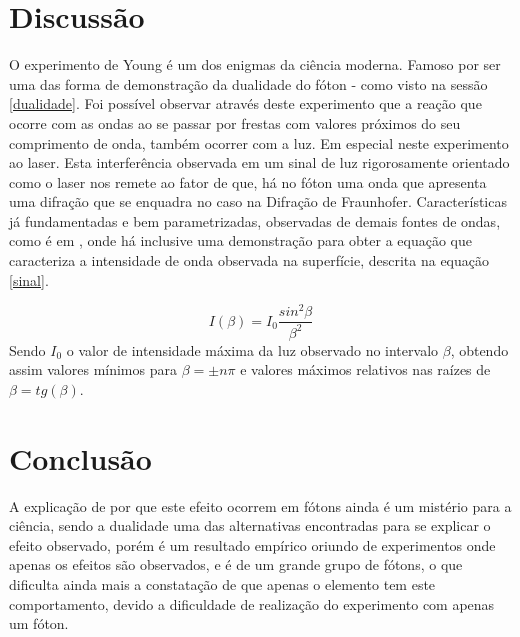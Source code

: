 \section{Discussão}\label{discurso}


O experimento de Young é um dos enigmas da ciência moderna. Famoso por ser uma das forma de demonstração da dualidade do fóton - como visto na sessão \ref{dualidade}. Foi possível observar através deste experimento que a reação que ocorre com as ondas ao se passar por frestas com valores próximos do seu comprimento de onda, também ocorrer com a luz. Em especial neste experimento ao laser. Esta interferência observada em um sinal de luz rigorosamente orientado como o laser nos remete ao fator de que, há no fóton uma onda que apresenta uma difração que se enquadra no caso na Difração de Fraunhofer. Características já fundamentadas e bem parametrizadas, observadas de demais fontes de ondas, como é em \cite{ondas}, onde há inclusive uma demonstração para obter a equação que caracteriza a intensidade de onda observada na superfície, descrita na equação \ref{sinal}.


\begin{equation}\label{sinal}
	I(\beta)=I_0 \frac{sin^2\beta}{\beta^2}
\end{equation}
Sendo $I_0$ o valor de intensidade máxima da luz observado no intervalo $\beta$, obtendo assim valores mínimos para $\beta=\pm n \pi$ e valores máximos relativos nas raízes de $\beta=tg(\beta)$.


\section{Conclusão}\label{conclusion}

A explicação de por que este efeito ocorrem  em fótons ainda é um mistério para a ciência, sendo a dualidade uma das alternativas encontradas para se explicar o efeito observado, porém é um resultado empírico oriundo de experimentos onde apenas os efeitos são observados, e é de um grande grupo de fótons, o que dificulta ainda mais a constatação de que apenas o elemento tem este comportamento, devido a dificuldade de realização do experimento com apenas um fóton.

